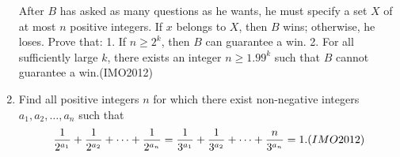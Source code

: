 \begin{enumerate}
				After $B$ has asked as many questions as he wants, he must specify a set $X$ of at most $n$ positive integers. If $x$ belongs to $X$, then $B$ wins; otherwise, he loses. Prove that:
				1. If $n\geq{2^{k}}$, then $B$ can guarantee a win.
				2. For all sufficiently large $k$, there exists an integer $n\geq{1.99^{k}}$ such that $B$ cannot guarantee a win.\hfill(IMO2012)
			\item  Find all positive integers $n$ for which there exist non-negative integers $a_{1}, a_{2}, \dots, a_{n}$ such that
				\begin{align}
					\frac{1}{2^{a_{1}}}+\frac{1}{2^{a_{2}}}+ \dots +\frac{1}{2^{a_{n}}}=\frac{1}{3^{a_{1}}}+\frac{1}{3^{a_{2}}}+ \dots +\frac{n}{3^{a_{n}}}=1.\hfill(IMO2012)
				\end{align}

\end{enumerate}
